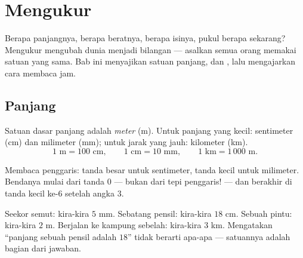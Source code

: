 \chapter{Mengukur}\label{ch:g3:measure}

Berapa panjangnya, berapa beratnya, berapa isinya, pukul berapa
sekarang? Mengukur mengubah dunia menjadi bilangan --- asalkan semua
orang memakai satuan yang sama. Bab ini menyajikan satuan panjang,
 dan , lalu mengajarkan cara membaca jam.

\section{Panjang}

\begin{definition}\label{def:g3:measure:length}
Satuan dasar panjang adalah \emph{meter} (m). Untuk panjang yang
kecil: sentimeter (cm) dan milimeter (mm); untuk jarak yang jauh:
kilometer (km).
\[
1 \text{ m} = 100 \text{ cm}, \qquad
1 \text{ cm} = 10 \text{ mm}, \qquad
1 \text{ km} = 1\,000 \text{ m}.
\]
\end{definition}

\begin{omfigure}

{\small Membaca penggaris: tanda besar untuk sentimeter, tanda kecil
untuk milimeter. Bendanya mulai dari tanda $0$ --- bukan dari tepi
penggaris! --- dan berakhir di tanda kecil ke-$6$ setelah angka $3$.}
\end{omfigure}

\begin{example}\label{ex:g3:measure:choose}
Seekor semut: kira-kira $5$ mm. Sebatang pensil: kira-kira $18$ cm.
Sebuah pintu: kira-kira $2$ m. Berjalan ke kampung sebelah: kira-kira
$3$ km. Mengatakan ``panjang sebuah pensil adalah $18$'' tidak berarti
apa-apa --- satuannya adalah bagian dari jawaban.
\end{example}

